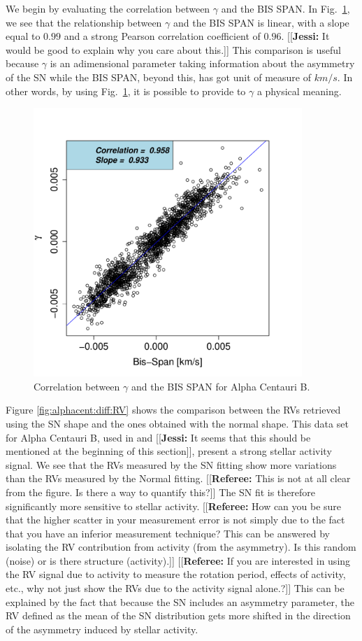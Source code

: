 \documentclass[11pt, oneside]{article}
\newcommand{\jessi}[1]{{\color{Purple}[[\textbf{Jessi: }#1]]}}
\newcommand{\comment}[1]{{\color{red}[[\textbf{Referee: }#1]]}}
\begin{document}
We begin by evaluating the correlation between $\gamma$ and the BIS SPAN. In Fig.~\ref{fig:alphacent:corr.gamma}, we see that the relationship between $\gamma$ and the BIS SPAN is linear, with a slope equal to $0.99$ and a strong Pearson correlation coefficient of $0.96$. \jessi{It would be good to explain why you care about this.} This comparison is useful because $\gamma$ is an adimensional parameter taking information about the asymmetry of the SN while the BIS SPAN, beyond this, has got unit of measure of $km/s$. In other words, by using Fig.~\ref{fig:alphacent:corr.gamma}, it is possible to provide to $\gamma$ a physical meaning.
%
\begin{figure}[htbp]
   \centering
\includegraphics[height = 4in]{HD12862_[2]gamma_vs_bisspan.pdf} 
   \caption{Correlation between $\gamma$ and the BIS SPAN for Alpha Centauri B.}
   \label{fig:alphacent:corr.gamma}
\end{figure}

Figure \ref{fig:alphacent:diff:RV} shows the comparison between the RVs retrieved using the SN shape and the ones obtained with the normal shape. This data set for Alpha Centauri B, used in \citet{Dumusque-2012} and \citet{Thompson-2017} \jessi{It seems that this should be mentioned at the beginning of this section}, present a strong stellar activity signal. We see that the RVs measured by the SN fitting show more variations than the RVs measured by the Normal fitting. 
\comment{This is not at all clear from the figure. Is there a way to quantify this?}
The SN fit is therefore significantly more sensitive to stellar activity. 
\comment{How can you be sure that the higher scatter in your measurement error is not simply due to the fact that you have an inferior measurement technique? This can be answered by isolating the RV contribution from activity (from the asymmetry). Is this random (noise) or is there structure (activity).}
\comment{If you are interested in using the RV signal due to activity to measure the rotation period, effects of activity, etc., why not just show the RVs due to the activity signal alone.?}
This can be explained by the fact that because the SN includes an asymmetry parameter, the RV defined as the mean of the SN distribution gets more shifted in the direction of the asymmetry induced by stellar activity.
\end{document}
